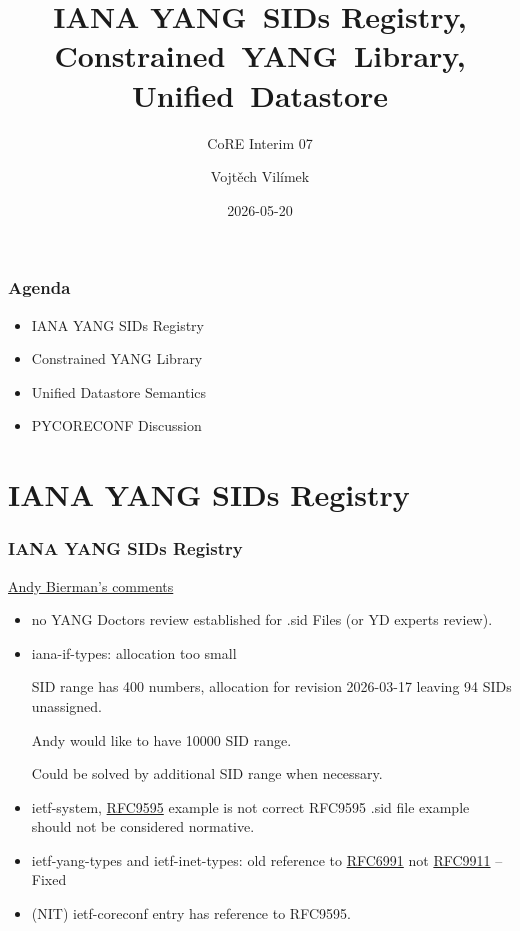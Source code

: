 \documentclass[aspectratio=169]{beamer}
\title{IANA YANG~SIDs Registry, Constrained~YANG~Library, Unified~Datastore}
\subtitle{CoRE Interim 07}
\author{Vojtěch Vilímek}
\date{2026-05-20}
\begin{document}
\begin{frame}
  \titlepage
\end{frame}

\begin{frame}
  \frametitle{Agenda}

  \begin{itemize}
    \item IANA YANG SIDs Registry
    \item Constrained YANG Library
    \item Unified Datastore Semantics
    \item PYCORECONF Discussion
  \end{itemize}	
\end{frame}

\section{IANA YANG SIDs Registry}
\begin{frame}
  \frametitle{IANA YANG SIDs Registry} 

  \begin{block}{\href{https://mailarchive.ietf.org/arch/msg/yang-tooling/Sr-AMBFO-WBoHcIog7iaMDqS2I4/}{Andy Bierman's comments}}
    \begin{itemize}
      \item no YANG Doctors review established for .sid Files (or YD experts review).
      \item iana-if-types: allocation too small
      \vspace{0.3em}

      SID range has 400 numbers, allocation for revision 2026-03-17 leaving 94 SIDs unassigned.

      Andy would like to have 10000 SID range.

      Could be solved by additional SID range when necessary.

      \item ietf-system, \href{https://datatracker.ietf.org/doc/html/rfc9595}{RFC9595} example is not correct
      RFC9595 .sid file example should not be considered normative.

      \item ietf-yang-types and ietf-inet-types: old reference to 
      \href{https://datatracker.ietf.org/doc/html/rfc6991}{RFC6991} not \href{https://datatracker.ietf.org/doc/html/rfc9911}{RFC9911} -- Fixed

      \item (NIT) ietf-coreconf entry has reference to RFC9595.
    \end{itemize}
  \end{block}
\end{frame}
\end{document}

